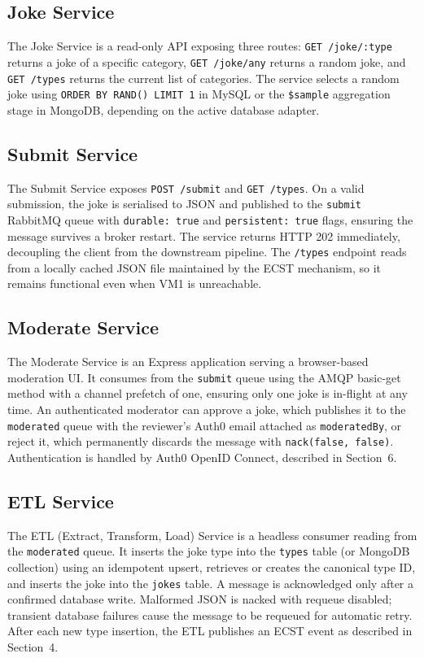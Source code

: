 \documentclass[12pt,a4paper]{article}
\begin{document}
\subsection{Joke Service}

The Joke Service is a read-only API exposing three routes: \texttt{GET /joke/:type} returns a joke of a specific category, \texttt{GET /joke/any} returns a random joke, and \texttt{GET /types} returns the current list of categories. The service selects a random joke using \texttt{ORDER BY RAND() LIMIT 1} in MySQL or the \texttt{\$sample} aggregation stage in MongoDB, depending on the active database adapter.

\subsection{Submit Service}

The Submit Service exposes \texttt{POST /submit} and \texttt{GET /types}. On a valid submission, the joke is serialised to JSON and published to the \texttt{submit} RabbitMQ queue with \texttt{durable: true} and \texttt{persistent: true} flags, ensuring the message survives a broker restart. The service returns HTTP 202 immediately, decoupling the client from the downstream pipeline. The \texttt{/types} endpoint reads from a locally cached JSON file maintained by the ECST mechanism, so it remains functional even when VM1 is unreachable.

\subsection{Moderate Service}

The Moderate Service is an Express application serving a browser-based moderation UI. It consumes from the \texttt{submit} queue using the AMQP basic-get method with a channel prefetch of one, ensuring only one joke is in-flight at any time. An authenticated moderator can approve a joke, which publishes it to the \texttt{moderated} queue with the reviewer's Auth0 email attached as \texttt{moderatedBy}, or reject it, which permanently discards the message with \texttt{nack(false, false)}. Authentication is handled by Auth0 OpenID Connect, described in Section~6.

\subsection{ETL Service}

The ETL (Extract, Transform, Load) Service is a headless consumer reading from the \texttt{moderated} queue. It inserts the joke type into the \texttt{types} table (or MongoDB collection) using an idempotent upsert, retrieves or creates the canonical type ID, and inserts the joke into the \texttt{jokes} table. A message is acknowledged only after a confirmed database write. Malformed JSON is nacked with requeue disabled; transient database failures cause the message to be requeued for automatic retry. After each new type insertion, the ETL publishes an ECST event as described in Section~4.
\end{document}
